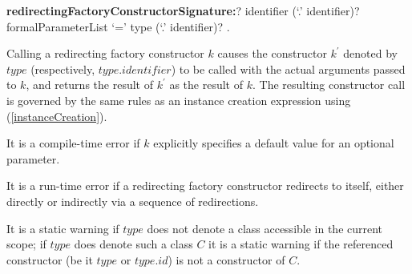 \documentclass{article}
\begin{document}
\begin{grammar}
{\bf redirectingFactoryConstructorSignature:}\CONST{}? \FACTORY{} identifier (`{\escapegrammar .}' identifier)? formalParameterList
  \gnewline{} `=' type (`{\escapegrammar .}' identifier)?
  .
\end{grammar}

\LMHash{}
Calling a redirecting factory constructor $k$ causes the constructor $k^\prime$ denoted by $type$ (respectively, $type.identifier$) to be called with the actual arguments passed to $k$, and returns the result of $k^\prime$ as the result of $k$.
The resulting constructor call is governed by the same rules as an instance creation expression using \NEW{} (\ref{instanceCreation}).


\LMHash{}
It is a compile-time error if $k$ explicitly specifies a default value for an optional parameter.

\LMHash{}
It is a run-time error if a redirecting factory constructor redirects to itself, either directly or indirectly via a sequence of redirections. %



\LMHash{}
It is a static warning if $type$ does not denote a class accessible in the current scope; if $type$ does denote such a class $C$ it is a static warning if the referenced constructor (be it $type$ or $type.id$) is not a constructor of $C$.
\end{document}
